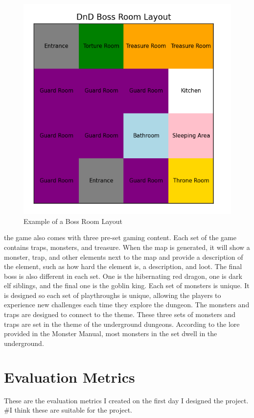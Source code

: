 \documentclass[10pt,twocolumn]{article}
\begin{document}
\begin{figure}[h]
\centering
\includegraphics[width=0.5\linewidth]{bossmap.png}
\caption{Example of a Boss Room Layout}
\label{fig:boss-room}
\end{figure}
the game also comes with three pre-set gaming content. Each set of the game contains traps, monsters, and treasure.  When the map is generated, it will show a monster, trap, and other elements next to the map and provide a description of the element, such as how hard the element is, a description, and loot.  The final boss is also different in each set. One is the hibernating red dragon, one is dark elf siblings, and the final one is the goblin king. Each set of monsters is unique. It is designed so each set of playthroughs is unique, allowing the players to experience new challenges each time they explore the dungeon. The monsters and traps are designed to connect to the theme. These three sets of monsters and traps are set in the theme of the underground dungeons. According to the lore provided in the Monster Manual, most monsters in the set dwell in the underground.   


\section{Evaluation Metrics}

These are the evaluation metrics I created on the first day I designed the project. #I think these are suitable for the project.
\end{document}
